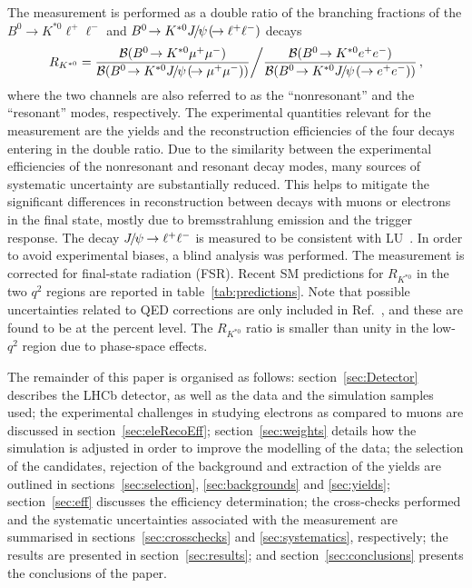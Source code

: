 \documentclass[12pt,a4paper]{article}
\def\RKst    {\mbox{R_{\Kstarz}}}
\def\lhcb {\mbox{LHCb}\xspace}
\def\Pmu         {\ensuremath{\upmu}\xspace}
\def\Ppsi        {\ensuremath{\uppsi}\xspace}
\def\PB      {\ensuremath{\mathrm{B}}\xspace}
\def\PJ      {\ensuremath{\mathrm{J}}\xspace}
\def\PK      {\ensuremath{\mathrm{K}}\xspace}
\def\Pe      {\ensuremath{\mathrm{e}}\xspace}
\def\Pmu         {\ensuremath{\mu}\xspace}
\def\Ppsi        {\ensuremath{\psi}\xspace}
\def\PB      {\ensuremath{B}\xspace}
\def\PJ      {\ensuremath{J}\xspace}
\def\PK      {\ensuremath{K}\xspace}
\def\Pe      {\ensuremath{e}\xspace}
\def\epem       {\ensuremath{\Pe^+\Pe^-}\xspace}
\def\mup        {\ensuremath{\Pmu^+}\xspace}
\def\mun        {\ensuremath{\Pmu^-}\xspace} \def\mumu       {\ensuremath{\Pmu^+\Pmu^-}\xspace}
\def\ellm       {\ensuremath{\ell^-}\xspace}
\def\ellp       {\ensuremath{\ell^+}\xspace}
\def\kaon  {\ensuremath{\PK}\xspace}
\def\Kstarz  {\ensuremath{\kaon^{*0}}\xspace}
\def\B       {\ensuremath{\PB}\xspace}
\def\Bd      {\ensuremath{\B^0}\xspace}
\def\jpsi     {\ensuremath{{\PJ\mskip -3mu/\mskip -2mu\Ppsi\mskip 2mu}}\xspace}
\def\BF         {{\ensuremath{\cal B}\xspace}}
\def\BR         {\BF}
\newcommand{\decay}[2]{\ensuremath{#1\!\to #2}\xspace}         \def\ra                 {\ensuremath{\rightarrow}\xspace}
\def\to                 {\ensuremath{\rightarrow}\xspace}
\def\qsq       {\ensuremath{q^2}\xspace}
\def\BdToKstmm    {\decay{\Bd}{\Kstarz\mup\mun}}
\def\lqsq{low-\qsq}
\def\RKst{\ensuremath{R_{\Kstarz}}\xspace}
\def\ll{\ensuremath{\ellp\ellm}\xspace}
\def\BdToKstll{\mbox{\decay{\Bd}{\Kstarz \ll}}\xspace}
\def\BdToKstmm{\mbox{\decay{\Bd}{\Kstarz \mumu}}\xspace}
\def\BdToKstee{\mbox{\decay{\Bd}{\Kstarz \epem}}\xspace}
\def\BdToKstJPsll{\mbox{\decay{\Bd}{\Kstarz \jpsi(\decay{}{\ll})}}\xspace}
\def\BdToKstJPsmm{\mbox{\decay{\Bd}{\Kstarz \jpsi(\decay{}{\mumu})}}\xspace}
\def\BdToKstJPsee{\mbox{\decay{\Bd}{\Kstarz \jpsi(\to\epem)}}\xspace}
\begin{document}
The measurement is performed as a double ratio of the branching fractions of the \BdToKstll and \BdToKstJPsll decays
\begin{eqnarray*}
\RKst = {\frac{\BR(\BdToKstmm)}{\BR(\BdToKstJPsmm)}} \bigg{/} {\frac{\BR(\BdToKstee)}{\BR(\BdToKstJPsee)}} \, ,
\end{eqnarray*}
where the two channels are also referred to as the ``nonresonant'' and the ``resonant'' modes, respectively.
The experimental quantities relevant for the measurement are the yields and the reconstruction efficiencies of the four decays entering in the double ratio.
Due to the similarity between the experimental efficiencies of the nonresonant and resonant decay modes, many sources of systematic uncertainty are substantially reduced.
This helps to mitigate the significant differences in reconstruction between decays with muons or electrons in the final state, mostly due to bremsstrahlung emission and  the trigger response.
The decay \mbox{\decay{\jpsi}{\ll}} is measured to be consistent with LU~\cite{Olive:2016xmw}.
In order to avoid experimental biases, a blind analysis was performed.
The measurement is corrected for final-state radiation (FSR).
Recent SM predictions for \RKst in the two \qsq regions are reported in table~\ref{tab:predictions}.
Note that possible uncertainties related to QED corrections are only included in Ref.~\cite{Bordone:2016gaq}, and these are found to be at the percent level.
The \RKst ratio is smaller than unity in the \lqsq region due to phase-space effects.

The remainder of this paper is organised as follows:
section~\ref{sec:Detector} describes the \lhcb detector, as well as the data and the simulation samples used;
the experimental challenges in studying electrons as compared to muons are discussed in section~\ref{sec:eleRecoEff};
section~\ref{sec:weights} details how the simulation is adjusted in order to improve the modelling of the data;
the selection of the candidates, rejection of the background and extraction of the yields are outlined in sections~\ref{sec:selection}, \ref{sec:backgrounds} and \ref{sec:yields};
section~\ref{sec:eff} discusses the efficiency determination;
the cross-checks performed and the systematic uncertainties associated with the measurement are summarised in sections~\ref{sec:crosschecks} and \ref{sec:systematics}, respectively;
the results are presented in section~\ref{sec:results};
and section~\ref{sec:conclusions} presents the conclusions of the paper.
\end{document}
